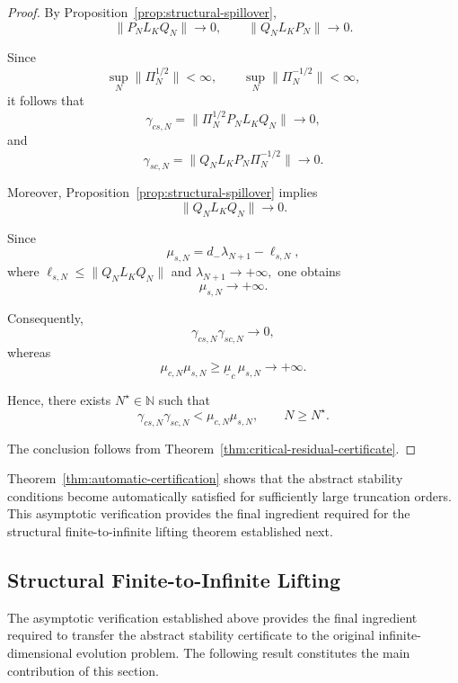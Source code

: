\documentclass[pdflatex,sn-mathphys-num]{sn-jnl}
\theoremstyle{thmstyleone}%
\theoremstyle{thmstyletwo}%
\theoremstyle{thmstylethree}%
\begin{document}
\begin{proof}

By Proposition~\ref{prop:structural-spillover},
\[
\|P_NL_KQ_N\|
\longrightarrow0,
\qquad
\|Q_NL_KP_N\|
\longrightarrow0.
\]

Since
\[
\sup_N\|\Pi_N^{1/2}\|<\infty,
\qquad
\sup_N\|\Pi_N^{-1/2}\|<\infty,
\]
it follows that
\[
\gamma_{cs,N}
=
\|\Pi_N^{1/2}P_NL_KQ_N\|
\longrightarrow0,
\]
and
\[
\gamma_{sc,N}
=
\|Q_NL_KP_N\Pi_N^{-1/2}\|
\longrightarrow0.
\]

Moreover, Proposition~\ref{prop:structural-spillover} implies
\[
\|Q_NL_KQ_N\|
\longrightarrow0.
\]

Since
\[
\mu_{s,N}
=
d_-\lambda_{N+1}
-
\ell_{s,N},
\]
where
\(
\ell_{s,N}\le\|Q_NL_KQ_N\|
\)
and
\(
\lambda_{N+1}\to+\infty,
\)
one obtains
\[
\mu_{s,N}
\longrightarrow+\infty.
\]

Consequently,
\[
\gamma_{cs,N}\gamma_{sc,N}
\longrightarrow0,
\]
whereas
\[
\mu_{c,N}\mu_{s,N}
\ge
\underline{\mu}_c\,\mu_{s,N}
\longrightarrow+\infty.
\]

Hence, there exists \(N^\star\in\mathbb N\) such that
\[
\gamma_{cs,N}\gamma_{sc,N}
<
\mu_{c,N}\mu_{s,N},
\qquad
N\ge N^\star.
\]

The conclusion follows from Theorem~\ref{thm:critical-residual-certificate}.

\end{proof}

Theorem~\ref{thm:automatic-certification} shows that the abstract stability conditions become automatically satisfied for sufficiently large truncation orders. This asymptotic verification provides the final ingredient required for the structural finite-to-infinite lifting theorem established next.

\subsection{Structural Finite-to-Infinite Lifting}
\label{subsec:finite-to-infinite-lifting}

The asymptotic verification established above provides the final ingredient required to transfer the abstract stability certificate to the original infinite-dimensional evolution problem. The following result constitutes the main contribution of this section.
\end{document}
